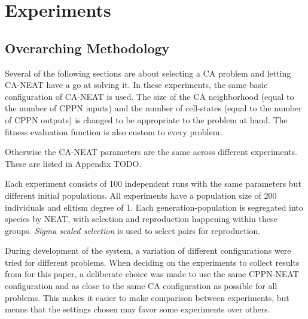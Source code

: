 \chapter{Experiments}
\label{chap:methodology}
\label{chap:experiments}

\section{Overarching Methodology}
Several of the following sections are about selecting a CA problem and letting CA-NEAT have a go at solving it.
In these experiments, the same basic configuration of CA-NEAT is used.
The size of the CA neighborhood (equal to the number of CPPN inputs) and the number of cell-states (equal to the number of CPPN outputs) is changed to be appropriate to the problem at hand.
The fitness evaluation function is also custom to every problem.

Otherwise the CA-NEAT parameters are the same across different experiments.
These are listed in Appendix TODO.

Each experiment consists of 100 independent runs with the same parameters but different initial populations.
All experiments have a population size of 200 individuals and elitism degree of 1.
Each generation-population is segregated into species by NEAT, with selection and reproduction happening within these groups.
\textit{Sigma scaled selection} \cite{hancock-1994} is used to select pairs for reproduction.

During development of the system, a variation of different configurations were tried for different problems.
When deciding on the experiments to collect results from for this paper,
a deliberate choice was made to use the same CPPN-NEAT configuration and as close to the same CA configuration as possible for all problems.
This makes it easier to make comparison between experiments, but means that the settings chosen may favor some experiments over others.





%


